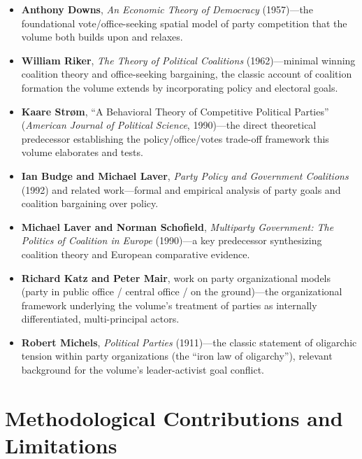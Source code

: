 \documentclass[12pt]{article}
\begin{document}
\begin{itemize}[leftmargin=*, itemsep=4pt]
    \item \textbf{Anthony Downs}, \textit{An Economic Theory of Democracy} (1957)---the foundational vote/office-seeking spatial model of party competition that the volume both builds upon and relaxes.
    \item \textbf{William Riker}, \textit{The Theory of Political Coalitions} (1962)---minimal winning coalition theory and office-seeking bargaining, the classic account of coalition formation the volume extends by incorporating policy and electoral goals.
    \item \textbf{Kaare Str\o m}, ``A Behavioral Theory of Competitive Political Parties'' (\textit{American Journal of Political Science}, 1990)---the direct theoretical predecessor establishing the policy/office/votes trade-off framework this volume elaborates and tests.
    \item \textbf{Ian Budge and Michael Laver}, \textit{Party Policy and Government Coalitions} (1992) and related work---formal and empirical analysis of party goals and coalition bargaining over policy.
    \item \textbf{Michael Laver and Norman Schofield}, \textit{Multiparty Government: The Politics of Coalition in Europe} (1990)---a key predecessor synthesizing coalition theory and European comparative evidence.
    \item \textbf{Richard Katz and Peter Mair}, work on party organizational models (party in public office / central office / on the ground)---the organizational framework underlying the volume's treatment of parties as internally differentiated, multi-principal actors.
    \item \textbf{Robert Michels}, \textit{Political Parties} (1911)---the classic statement of oligarchic tension within party organizations (the ``iron law of oligarchy''), relevant background for the volume's leader-activist goal conflict.
\end{itemize}

\section{Methodological Contributions and Limitations}
\end{document}

